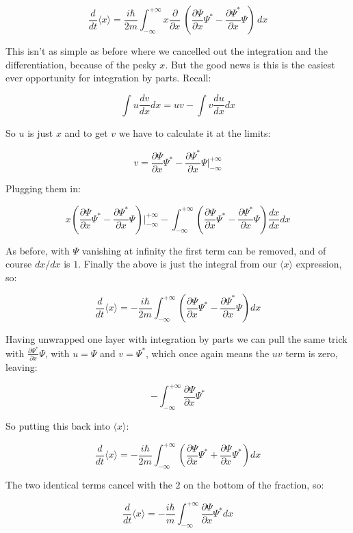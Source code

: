 $$
\frac{d}{dt} \langle x \rangle =
\frac{i \hbar}{2m}
\int_{-\infty}^{+\infty}
x
\frac{\partial}{\partial x} \
\left(
\frac{\partial \Psi}{\partial x}\Psi^*
- \frac{\partial \Psi^*}{\partial x}\Psi
\right)
\,dx
$$

This isn't as simple as before where we cancelled out the integration and the differentiation, because of the pesky $x$. But the good news is this is the easiest ever opportunity for integration by parts. Recall:

$$
\int
u
\frac{dv}{dx}
dx = uv -
\int
v
\frac{du}{dx}
dx
$$

So $u$ is just $x$ and to get $v$ we have to calculate it at the limits:

$$
v =
\frac{\partial \Psi}{\partial x}\Psi^*
- \frac{\partial \Psi^*}{\partial x}\Psi
\bigg\rvert_{-\infty}^{+\infty}
$$

Plugging them in:

$$
x
\left(
\frac{\partial \Psi}{\partial x}\Psi^*
- \frac{\partial \Psi^*}{\partial x}\Psi
\right)
\bigg\rvert_{-\infty}^{+\infty}
-
\int_{-\infty}^{+\infty}
\left(
\frac{\partial \Psi}{\partial x}\Psi^*
- \frac{\partial \Psi^*}{\partial x}\Psi
\right)
\frac{dx}{dx}
dx
$$

As before, with $\Psi$ vanishing at infinity the first term can be removed, and of course $dx/dx$ is $1$. Finally the above is just the integral from our $\langle x \rangle$ expression, so:

$$
\frac{d}{dt} \langle x \rangle = -
\frac{i \hbar}{2m}
\int_{-\infty}^{+\infty}
\left(
\frac{\partial \Psi}{\partial x}\Psi^*
- \frac{\partial \Psi^*}{\partial x}\Psi
\right)
dx
$$

Having unwrapped one layer with integration by parts we can pull the same trick with $\frac{\partial \Psi^*}{\partial x}\Psi$, with $u = \Psi$ and $v = \Psi^*$, which once again means the $uv$ term is zero, leaving:

$$
-
\int_{-\infty}^{+\infty}
\frac{\partial \Psi}{\partial x}
\Psi^*
$$

So putting this back into $\langle x \rangle$:

$$
\frac{d}{dt} \langle x \rangle = -
\frac{i \hbar}{2m}
\int_{-\infty}^{+\infty}
\left(
\frac{\partial \Psi}{\partial x}\Psi^*
+ \frac{\partial \Psi}{\partial x}\Psi^*
\right)
dx
$$

The two identical terms cancel with the $2$ on the bottom of the fraction, so:

$$
\frac{d}{dt} \langle x \rangle = -
\frac{i \hbar}{m}
\int_{-\infty}^{+\infty}
\frac{\partial \Psi}{\partial x}\Psi^*
dx
$$

